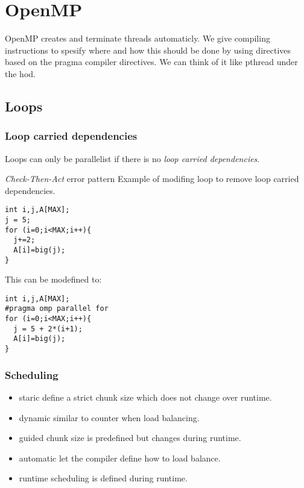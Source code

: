 \section{OpenMP}
OpenMP creates and terminate threads automaticly. We give compiling instructions
to spesify where and how this should be done by using directives based on the pragma compiler directives.
We can think of it like pthread under the hod.

\subsection{Loops}
\subsubsection{Loop carried dependencies}
Loops can only be parallelist if there is no \textit{loop carried dependencies}.
\begin{exampleblock}{\textit{Check-Then-Act} error pattern}
Example of modifing loop to remove loop carried dependencies.
\begin{BVerbatim}[baseline=c]
int i,j,A[MAX];
j = 5;
for (i=0;i<MAX;i++){
  j+=2;
  A[i]=big(j);
}
\end{BVerbatim}

This can be modefined to:
\begin{BVerbatim}[baseline=c]
int i,j,A[MAX];
#pragma omp parallel for
for (i=0;i<MAX;i++){
  j = 5 + 2*(i+1);
  A[i]=big(j);
}
\end{BVerbatim}
\end{exampleblock}

\subsubsection{Scheduling}
\begin{itemize}
  \item staric\: define a strict chunk size which does not change over runtime.
  \item dynamic\: similar to counter when load balancing.
  \item guided\: chunk size is predefined but changes during runtime.
  \item automatic\: let the compiler define how to load balance.
  \item runtime\: scheduling is defined during runtime.
\end{itemize}

